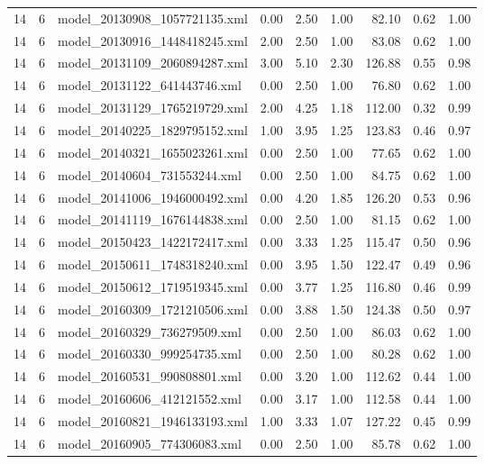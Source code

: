 \begin{table}[ht]
\begin{tabular}{rrlrrrrrr}
   14 &   6 & model\_20130908\_1057721135.xml & 0.00 & 2.50 & 1.00 & 82.10 & 0.62 & 1.00 \\ 
   14 &   6 & model\_20130916\_1448418245.xml & 2.00 & 2.50 & 1.00 & 83.08 & 0.62 & 1.00 \\ 
   14 &   6 & model\_20131109\_2060894287.xml & 3.00 & 5.10 & 2.30 & 126.88 & 0.55 & 0.98 \\ 
   14 &   6 & model\_20131122\_641443746.xml & 0.00 & 2.50 & 1.00 & 76.80 & 0.62 & 1.00 \\ 
   14 &   6 & model\_20131129\_1765219729.xml & 2.00 & 4.25 & 1.18 & 112.00 & 0.32 & 0.99 \\ 
   14 &   6 & model\_20140225\_1829795152.xml & 1.00 & 3.95 & 1.25 & 123.83 & 0.46 & 0.97 \\ 
   14 &   6 & model\_20140321\_1655023261.xml & 0.00 & 2.50 & 1.00 & 77.65 & 0.62 & 1.00 \\ 
   14 &   6 & model\_20140604\_731553244.xml & 0.00 & 2.50 & 1.00 & 84.75 & 0.62 & 1.00 \\ 
   14 &   6 & model\_20141006\_1946000492.xml & 0.00 & 4.20 & 1.85 & 126.20 & 0.53 & 0.96 \\ 
   14 &   6 & model\_20141119\_1676144838.xml & 0.00 & 2.50 & 1.00 & 81.15 & 0.62 & 1.00 \\ 
   14 &   6 & model\_20150423\_1422172417.xml & 0.00 & 3.33 & 1.25 & 115.47 & 0.50 & 0.96 \\ 
   14 &   6 & model\_20150611\_1748318240.xml & 0.00 & 3.95 & 1.50 & 122.47 & 0.49 & 0.96 \\ 
   14 &   6 & model\_20150612\_1719519345.xml & 0.00 & 3.77 & 1.25 & 116.80 & 0.46 & 0.99 \\ 
   14 &   6 & model\_20160309\_1721210506.xml & 0.00 & 3.88 & 1.50 & 124.38 & 0.50 & 0.97 \\ 
   14 &   6 & model\_20160329\_736279509.xml & 0.00 & 2.50 & 1.00 & 86.03 & 0.62 & 1.00 \\ 
   14 &   6 & model\_20160330\_999254735.xml & 0.00 & 2.50 & 1.00 & 80.28 & 0.62 & 1.00 \\ 
   14 &   6 & model\_20160531\_990808801.xml & 0.00 & 3.20 & 1.00 & 112.62 & 0.44 & 1.00 \\ 
   14 &   6 & model\_20160606\_412121552.xml & 0.00 & 3.17 & 1.00 & 112.58 & 0.44 & 1.00 \\ 
   14 &   6 & model\_20160821\_1946133193.xml & 1.00 & 3.33 & 1.07 & 127.22 & 0.45 & 0.99 \\ 
   14 &   6 & model\_20160905\_774306083.xml & 0.00 & 2.50 & 1.00 & 85.78 & 0.62 & 1.00 \\ 

\end{tabular}
\end{table}
